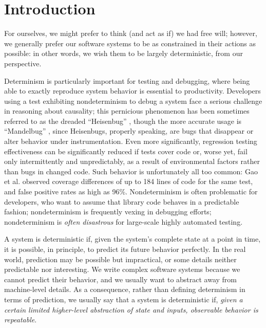 \section{Introduction}

For ourselves, we might prefer to think (and act as if) we had free
will; however, we generally prefer our software systems to be as
constrained in their actions as possible:  in other words, we wish
them to be largely deterministic, from our perspective.

Determinism is particularly important for testing and debugging, where
being able to exactly reproduce system behavior is essential to
productivity.  Developers using a test exhibiting nondeterminism
to debug a system
face a serious challenge in reasoning about causality; this
pernicious phenomenon has been sometimes referred to as the dreaded
``Heisenbug'' \cite{Heisenbug}, though the more accurate usage is
``Mandelbug'' \cite{GrottkeBugs,FaultTriggers}, since Heisenbugs, properly speaking, are bugs that disappear or
alter behavior under instrumentation.
Even more significantly, regression testing
effectiveness can be significantly reduced if tests cover code or,
worse yet, fail only
intermittently and unpredictably, as a result of environmental
factors rather than bugs in changed code.  Such behavior is
unfortunately all too common:  Gao et
al. \cite{Gao:2015:MSU:2818754.2818764} observed coverage differences
of up to 184 lines of code for the same test, and false positive rates
as high as 96\%.  Nondeterminism is often problematic for
developers, who want to  assume that library code behaves in a  predictable fashion; nondeterminism is
frequently vexing in debugging efforts; nondeterminism is \emph{often disastrous} for large-scale highly
automated testing.



A system is deterministic if, given the system's complete state at a point in
time, it is possible, in principle, to predict its future behavior
perfectly.  In the real world,
prediction may be possible but  impractical, or some details neither
predictable nor interesting.  We write
complex software systems because we cannot predict their
behavior, and we usually want to abstract away from machine-level details.  As a consequence, rather than
defining determinism in terms of prediction, we usually 
say that a system is deterministic if, \emph{given a certain limited
  higher-level abstraction of state
and inputs, observable behavior is repeatable}.  %

